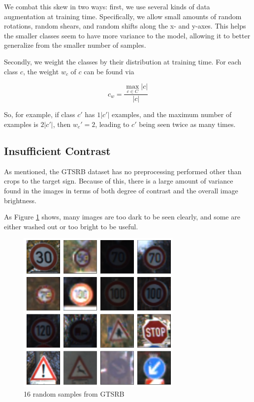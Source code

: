\documentclass[10pt,twocolumn,letterpaper]{article}
\begin{document}
We combat this skew in two ways: first, we use several kinds of data augmentation at training time. Specifically, we allow small amounts of random rotations, random shears,  and random shifts along the x- and y-axes. This helps the smaller classes seem to have more variance to the model, allowing it to better generalize from the smaller number of samples. 

Secondly, we weight the classes by their distribution at training time. For each  class $c$, the weight $w_c$ of $c$ can be found via 

\begin{equation}
    c_w=\frac{\max_{c\in C}|c|{}}{|c|}
\end{equation}

So, for example, if class $c'$ has $1|c'|$ examples, and the maximum number of examples
is $2|c'|$, then $w_c'=2$, leading to $c'$ being seen twice as many times. 

\subsection{Insufficient Contrast} 

As mentioned, the GTSRB dataset has no preprocessing performed other than crops to the target sign. Because of this, there is a large amount of variance found in the images in terms of both degree of contrast and the overall image brightness. 

As Figure \ref{fig:preclahe} shows, many images are too dark to be seen clearly, and some are either washed out or too bright to be useful. 

\begin{figure}[h]
\includegraphics[width=8cm]{example-clahe-before}
\centering
\caption{16 random samples from GTSRB}
\label{fig:preclahe}
\end{figure}
\end{document}
